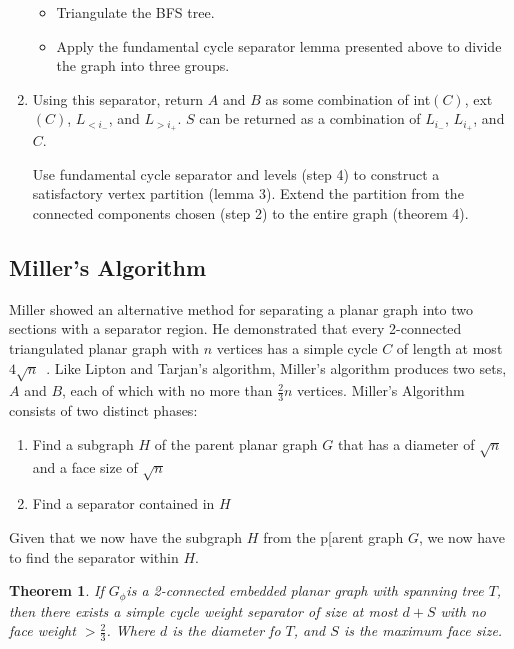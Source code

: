 \documentclass[12pt]{article}
\newtheorem{theorem}{Theorem}[section]
\begin{document}
\begin{enumerate}
\begin{itemize}
            \item Triangulate the BFS tree.

            \item Apply the fundamental cycle separator lemma presented above to divide the graph into three groups.
        \end{itemize}

        \item Using this separator, return $A$ and $B$ as some combination of int$(C)$, ext$(C)$, $L_{< i_-}$, and $L_{> i_+}$. $S$ can be returned as a combination of $L_{i_-}$, $L_{i_+}$, and $C$.

        Use fundamental cycle separator and levels (step 4) to construct a satisfactory vertex partition (lemma 3). Extend the partition from the connected components chosen (step 2) to the entire graph (theorem 4).
    \end{enumerate}

    \subsection{Miller's Algorithm}
    \label{sec:graph-sep-miller}

    Miller showed an alternative method for separating a planar graph into two sections with a separator region. He demonstrated that every 2-connected triangulated planar graph with $n$ vertices has a simple cycle $C$ of length at most $4\sqrt{n}$~\cite{miller1984finding}. Like Lipton and Tarjan's algorithm, Miller's algorithm produces two sets, $A$ and $B$, each of which with no more than $\frac{2}{3}n$ vertices. Miller's Algorithm consists of two distinct phases:
    \begin{enumerate}
      \item Find a subgraph $H$ of the parent planar graph $G$ that has a diameter of $\sqrt{n}$ and a face size of $\sqrt{n}$

      \item Find a separator contained in $H$
    \end{enumerate}

    Given that we now have the subgraph $H$ from the p[arent graph $G$, we now have to find the separator within $H$.
    \begin{theorem}
      If $G_\phi$is a 2-connected embedded planar graph with spanning tree $T$, then there exists a simple cycle weight separator of size at most $d + S$ with no face weight $> \frac{2}{3}$. Where $d$ is the diameter fo $T$, and $S$ is the maximum face size.
    \end{theorem}
\end{document}
